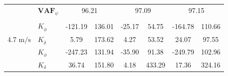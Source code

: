 \begin{table}[]
\begin{tabular}{llcccccc}
                                                   & $\mathbf{VAF}_\psi$                                    & \multicolumn{2}{c}{96.21}                                                                          & \multicolumn{2}{c}{97.09}                                                                          & \multicolumn{2}{c}{97.15}                                                                          \\
                                                   &                                                        & \multicolumn{1}{l}{}                        & \multicolumn{1}{l}{}                                 & \multicolumn{1}{l}{}                        & \multicolumn{1}{l}{}                                 & \multicolumn{1}{l}{}                        & \multicolumn{1}{l}{}                                 \\ \hline
                                                   & $K_{\dot{\phi}} $                                      & -121.19                                     & 136.01                                               & -25.17                                      & 54.75                                                & -164.78                                     & 110.66                                               \\
    \multirow{-2}{*}{4.7 $\si{\meter\per\second}$} & $K_{\dot{\delta}}$                                     & 5.79                                        & 173.62                                               & 4.27                                        & 53.52                                                & 24.07                                       & 97.55                                                \\
                                                   & $K_{\phi} $                                            & -247.23                                     & 131.94                                               & -35.90                                      & 91.38                                                & -249.79                                     & 102.96                                               \\
                                                   & $K_\delta $                                            & 36.74                                       & 151.80                                               & 4.18                                        & 433.29                                               & 17.36                                       & 324.16                                               \\

\end{tabular}
\end{table}

